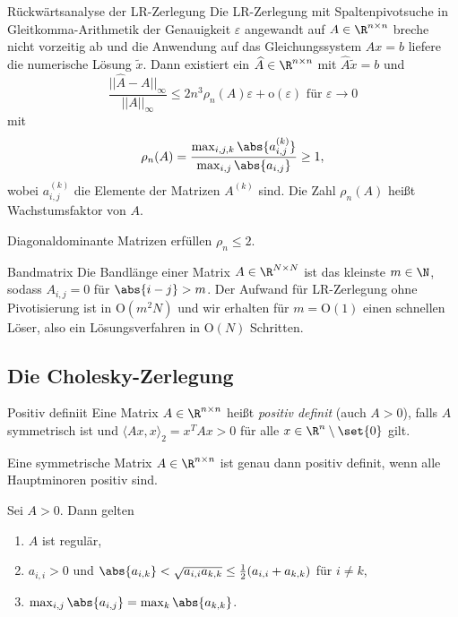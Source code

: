 \begin{karte}{Rückwärtsanalyse der LR-Zerlegung}
    Die LR-Zerlegung mit Spaltenpivotsuche in Gleitkomma-Arithmetik der Genauigkeit \( \varepsilon \)
    angewandt auf \( A \in \R^{n\times n} \) breche nicht vorzeitig ab und die Anwendung auf das 
    Gleichungssystem \( Ax = b \) liefere die numerische Lösung \( \tilde{x} \). Dann existiert ein 
    \( \widehat{A} \in \R^{n \times n} \) mit \( \widehat{A}\tilde{x} = b \) und 
    \[ \frac{ ||\widehat{A} - A ||_\infty }{ ||A||_\infty } \leq 2 n^3 \rho_n(A) \varepsilon + \mathrm{o}(\varepsilon) \text{ für } \varepsilon \rightarrow 0 \]
    mit 
    \[ \rho_n(A) = \frac{ \max_{i,j,k} \abs{ a_{i,j}^{(k)} } }{\max_{i,j} \abs{ a_{i,j} }} \geq 1, \]
    wobei \( a_{i,j}^{(k)} \) die Elemente der Matrizen \( A^{(k)} \) sind. Die Zahl \( \rho_n(A) \) heißt 
    Wachstumsfaktor von \(A\).

    Diagonaldominante Matrizen erfüllen \( \rho_n \leq 2 \).
\end{karte}

\begin{karte}{Bandmatrix}
    Die Bandlänge einer Matrix \(A \in \R^{N\times N} \) ist das kleinste \( m\in \N \), sodass \( A_{i,j} = 0 \) 
    für \( \abs{i-j} > m \). 
    Der Aufwand für LR-Zerlegung ohne Pivotisierung ist in \( \mathrm{O}(m^2N) \) 
    und wir erhalten für \( m = \mathrm{O}(1) \) einen schnellen Löser, also ein Lösungsverfahren in 
    \( \mathrm{O}(N) \) Schritten.
\end{karte}

\subsection*{Die Cholesky-Zerlegung}

\begin{karte}{Positiv definiit}
    Eine Matrix \( A\in\R^{n\times n} \) heißt \textit{positiv definit} (auch \(A > 0\)), 
    falls \( A \) symmetrisch ist und \( \langle Ax, x\rangle_2 = x^T Ax > 0 \) 
    für alle \( x\in\R^n \setminus \set{0} \) gilt.

    Eine symmetrische Matrix \( A \in \R^{n\times n} \) ist genau dann positiv definit, wenn alle 
    Hauptminoren positiv sind.

    Sei \(A > 0\). Dann gelten 
    \begin{enumerate}
        \item \(A\) ist regulär,
        \item \( a_{i,i} > 0 \) und \( \abs{ a_{i,k} } < \sqrt{a_{i,i} a_{k,k}} \leq \frac{1}{2} (a_{i,i} + a_{k,k}) \) für \( i\neq k \),
        \item \( \max_{i,j} \abs{a_{i,j}} = \max_{k} \abs{a_{k,k}} \).
    \end{enumerate}
\end{karte}

